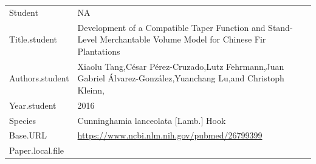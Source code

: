 \documentclass[]{article}
\begin{document}
\begin{longtable}[]{@{}ll@{}}
\toprule
\endhead
\begin{minipage}[t]{0.21\columnwidth}\raggedright
Student\strut
\end{minipage} & \begin{minipage}[t]{0.73\columnwidth}\raggedright
NA\strut
\end{minipage}\tabularnewline
\begin{minipage}[t]{0.21\columnwidth}\raggedright
Title.student\strut
\end{minipage} & \begin{minipage}[t]{0.73\columnwidth}\raggedright
Development of a Compatible Taper Function and Stand-Level Merchantable
Volume Model for Chinese Fir Plantations\strut
\end{minipage}\tabularnewline
\begin{minipage}[t]{0.21\columnwidth}\raggedright
Authors.student\strut
\end{minipage} & \begin{minipage}[t]{0.73\columnwidth}\raggedright
Xiaolu Tang,César Pérez-Cruzado,Lutz Fehrmann,Juan Gabriel
Álvarez-González,Yuanchang Lu,and Christoph Kleinn,\strut
\end{minipage}\tabularnewline
\begin{minipage}[t]{0.21\columnwidth}\raggedright
Year.student\strut
\end{minipage} & \begin{minipage}[t]{0.73\columnwidth}\raggedright
2016\strut
\end{minipage}\tabularnewline
\begin{minipage}[t]{0.21\columnwidth}\raggedright
Species\strut
\end{minipage} & \begin{minipage}[t]{0.73\columnwidth}\raggedright
Cunninghamia lanceolata {[}Lamb.{]} Hook\strut
\end{minipage}\tabularnewline
\begin{minipage}[t]{0.21\columnwidth}\raggedright
Base.URL\strut
\end{minipage} & \begin{minipage}[t]{0.73\columnwidth}\raggedright
\url{https://www.ncbi.nlm.nih.gov/pubmed/26799399}\strut
\end{minipage}\tabularnewline
\begin{minipage}[t]{0.21\columnwidth}\raggedright
Paper.local.file\strut
\end{minipage} & \begin{minipage}[t]{0.73\columnwidth}\raggedright

\end{minipage}
\end{longtable}
\end{document}
